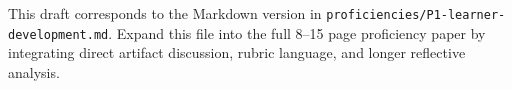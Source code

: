 \documentclass[12pt]{article}
\begin{document}
\begin{titlepage}\begin{center}\vspace*{0.2\textheight}{\Large\bfseries Proficiency 1: Learner Development\par}\vspace{2em}{\PortfolioAuthor\par}{\PortfolioAffiliation\par}{\PortfolioProgram\par}\vspace{2em}{\PortfolioDate\par}\end{center}\end{titlepage}
This draft corresponds to the Markdown version in \texttt{proficiencies/P1-learner-development.md}. Expand this file into the full 8--15 page proficiency paper by integrating direct artifact discussion, rubric language, and longer reflective analysis.
\end{document}

